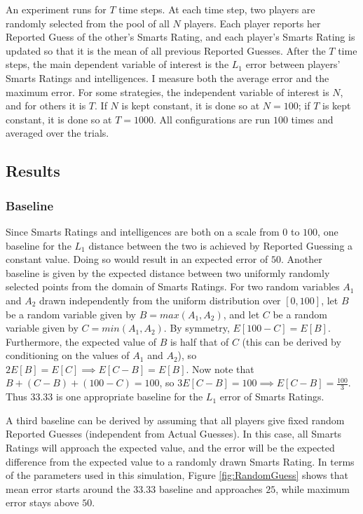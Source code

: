 An experiment runs for $T$ time steps. At each time step, two players are randomly selected from the pool of all $N$ players. Each player reports her Reported Guess of the other's Smarts Rating, and each player's Smarts Rating is updated so that it is the mean of all previous Reported Guesses. After the $T$ time steps, the main dependent variable of interest is the $L_1$ error between players' Smarts Ratings and intelligences. I measure both the average error and the maximum error. For some strategies, the independent variable of interest is $N$, and for others it is $T$. If $N$ is kept constant, it is done so at $N=100$; if $T$ is kept constant, it is done so at $T = 1000$. All configurations are run $100$ times and averaged over the trials.

\subsection{Results}

\subsubsection{Baseline}

Since Smarts Ratings and intelligences are both on a scale from $0$ to $100$, one baseline for the $L_1$ distance between the two is achieved by Reported Guessing a constant value. Doing so would result in an expected error of $50$. Another baseline is given by the expected distance between two uniformly randomly selected points from the domain of Smarts Ratings. For two random variables $A_1$ and $A_2$ drawn independently from the uniform distribution over $[0, 100]$, let $B$ be a random variable given by $B = max(A_1, A_2)$, and let $C$ be a random variable given by $C = min(A_1, A_2)$. By symmetry, $E[100 - C] = E[B]$. Furthermore, the expected value of $B$ is half that of $C$ (this can be derived by conditioning on the values of $A_1$ and $A_2$), so $2E[B] = E[C] \implies E[C-B] = E[B]$. Now note that $B + (C-B) + (100-C) = 100$, so $3E[C-B] = 100 \implies E[C-B] = \frac{100}{3}$. Thus $33.33$ is one appropriate baseline for the $L_1$ error of Smarts Ratings.

A third baseline can be derived by assuming that all players give fixed random Reported Guesses (independent from Actual Guesses). In this case, all Smarts Ratings will approach the expected value, and the error will be the expected difference from the expected value to a randomly drawn Smarts Rating. In terms of the parameters used in this simulation, Figure \ref{fig:RandomGuess} shows that mean error starts around the $33.33$ baseline and approaches $25$, while maximum error stays above $50$. 


